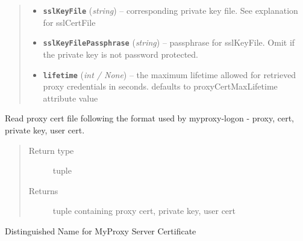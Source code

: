 \documentclass[letterpaper,10pt,english]{sphinxmanual}
\begin{document}
\begin{fulllineitems}
\begin{fulllineitems}
\begin{quote}
\begin{description}
\begin{itemize}
\item {} 
\textbf{\texttt{sslKeyFile}} (\emph{string}) -- corresponding private key file.  See explanation for sslCertFile

\item {} 
\textbf{\texttt{sslKeyFilePassphrase}} (\emph{string}) -- passphrase for sslKeyFile.  Omit if the         private key is not password protected.

\item {} 
\textbf{\texttt{lifetime}} (\emph{int / None}) -- the maximum lifetime allowed for retrieved proxy credentials in seconds. defaults to proxyCertMaxLifetime attribute value

\end{itemize}

\end{description}\end{quote}

\end{fulllineitems}


\begin{fulllineitems}
\label{client:myproxy.client.MyProxyClient.readProxyFile}
Read proxy cert file following the format used by myproxy-logon - 
proxy, cert, private key, user cert.
\begin{quote}\begin{description}
\item[{Return type}] \leavevmode
tuple

\item[{Returns}] \leavevmode
tuple containing proxy cert, private key, user cert

\end{description}\end{quote}

\end{fulllineitems}


\begin{fulllineitems}
\label{client:myproxy.client.MyProxyClient.serverDN}
Distinguished Name for MyProxy Server Certificate

\end{fulllineitems}



\end{fulllineitems}
\end{document}
